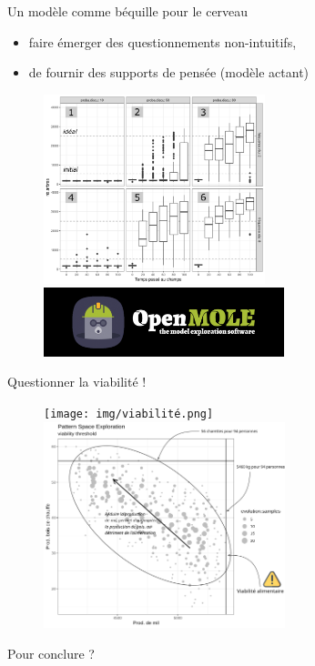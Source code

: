 \documentclass[aspectratio=169]{beamer}
\begin{document}
\begin{frame}{Un modèle comme béquille pour le cerveau}
    \begin{center}
        \vspace{-1em}

        \begin{itemize}
            \item faire émerger des questionnements non-intuitifs,
            \item de fournir des supports de pensée (modèle actant)
        \end{itemize}
        \begin{figure}
            \centering
            \includegraphics[height = 5.5cm]{img/boxplotReunionDiscussion.png}~
            \includegraphics[height = 2cm]{img/OpenMOLE-Banner.png}
        \end{figure}
    \end{center}
\end{frame}

\begin{frame}{Questionner la viabilité !}
    \begin{figure}
        \centering
        \texttt{[image: img/viabilité.png]}~
        \includegraphics[height = 6cm]{../../../img/om_pse.png}
    \end{figure}
\end{frame}

\begin{frame}{Pour conclure ? }
    
\end{frame}
\end{document}
